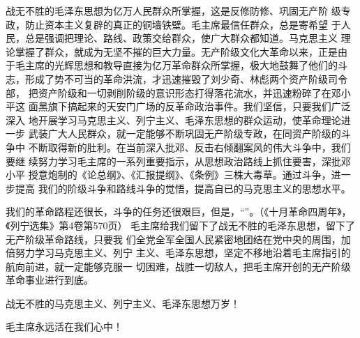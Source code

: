 \begin{hongqiarticle}
    战无不胜的毛泽东思想为亿万人民群众所掌握，这是反修防修、巩固无产阶
    级专政，防止资本主义复辟的真正的铜墙铁壁。毛主席最信任群众，总是寄希望
    于人民，总是强调把理论、路线、政策交给群众，使广大群众都知道。马克思主义
    理论掌握了群众，就成为无坚不摧的巨大力量。无产阶级文化大革命以来，正是由
    于毛主席的光辉思想和教导直接为亿万革命群众所掌握，极大地鼓舞了他们的斗
    志，形成了势不可当的革命洪流，才迅速摧毁了刘少奇、林彪两个资产阶级司令部，
    把资产阶级和一切剥削阶级的意识形态打得落花流水，并迅速粉碎了在邓小平这
    面黑旗下搞起来的天安门广场的反革命政治事件。我们坚信，只要我们广泛深入
    地开展学习马克思主义、列宁主义、毛泽东思想的群众运动，使革命理论进一步
    武装广大人民群众，就一定能够不断巩固无产阶级专政，在同资产阶级的斗争中
    不断取得新的肚利。在当前深入批邓、反击右倾翻案风的伟大斗争中，我们要继
    续努力学习毛主席的一系列重要指示，从思想政治路线上抓住要害，深批邓小平
    授意炮制的《论总纲》、《汇报提纲》、《条例》三株大毒草。通过斗争，进一步提高
    我们的阶级斗争和路线斗争的觉悟，提高自已的马克思主义的思想水平。
    
    我们的革命路程还很长，斗争的任务还很艰巨，但是，“”。（《十月革命四周年》，《列宁选集》第4卷第570页）
    毛主席给我们留下了战无不胜的毛泽东思想，留下了无产阶级革命路线，只要我
    们全党全军全国人民紧密地团结在党中央的周围，加倍努力学习马克思主义、列宁
    主义、毛泽东思想，坚定不移地沿着毛主席指引的航向前进，就一定能够克服一
    切困难，战胜一切敌人，把毛主席开创的无产阶级革命事业进行到底。
    
    战无不胜的马克思主义、列宁主义、毛泽东思想万岁！
    
    毛主席永远活在我们心中！
\end{hongqiarticle}